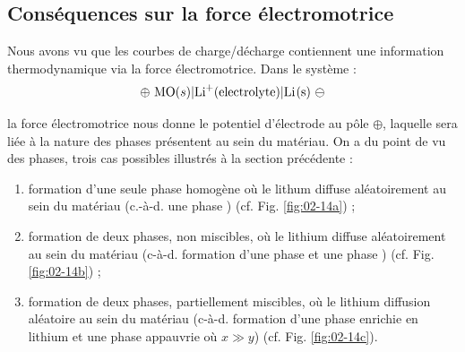 



\subsection{Conséquences sur la force électromotrice}

Nous avons vu que les courbes de charge/décharge contiennent une information thermodynamique via la force électromotrice. Dans le système :
\begin{equation*}
\oplus ~ \ce{MO} (s) | \ce{Li^+} (\text{electrolyte}) | \ce{Li(s)} ~ \ominus
\end{equation*} 

la force électromotrice nous donne le potentiel d'électrode au pôle $\oplus$, laquelle sera liée à la nature des phases présentent au sein du matériau. On a du point de vu des phases, trois cas possibles illustrés à la section précédente : 
\begin{enumerate}
\item formation d'une seule phase homogène où le lithum diffuse aléatoirement au sein du matériau (c.-à-d. une phase ) (cf. Fig. \ref{fig:02-14a}) ; 
\item formation de deux phases, non miscibles, où le lithium diffuse aléatoirement au sein du matériau (c-à-d. formation d'une phase  et une phase ) (cf. Fig. \ref{fig:02-14b}) ;
\item formation de deux phases, partiellement miscibles, où le lithium diffusion aléatoire au sein du matériau (c-à-d. formation d'une phase enrichie en lithium  et une phase appauvrie  où $x \gg y$) (cf. Fig. \ref{fig:02-14c}).
\end{enumerate}

